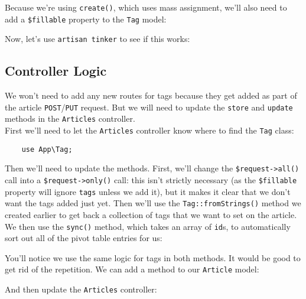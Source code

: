
Because we're using \texttt{create()}, which uses mass assignment, we'll also need to add a \texttt{\$fillable} property to the \texttt{Tag} model:


Now, let's use \texttt{artisan tinker} to see if this works:




\subsection{Controller Logic}

We won't need to add any new routes for tags because they get added as part of the article \texttt{POST}/\texttt{PUT} request. But we will need to update the \texttt{store} and \texttt{update} methods in the \texttt{Articles} controller.
\\

First we'll need to let the \texttt{Articles} controller know where to find the \texttt{Tag} class:

\begin{verbatim}
    use App\Tag;
\end{verbatim}

Then we'll need to update the methods. First, we'll change the \texttt{\$request->all()} call into a \texttt{\$request->only()} call: this isn't strictly necessary (as the \texttt{\$fillable} property will ignore \texttt{tags} unless we add it), but it makes it clear that we don't want the tags added just yet. Then we'll use the \texttt{Tag::fromStrings()} method we created earlier to get back a collection of tags that we want to set on the article. We then use the \texttt{sync()} method, which takes an array of \texttt{id}s, to automatically sort out all of the pivot table entries for us:


You'll notice we use the same logic for tags in both methods. It would be good to get rid of the repetition. We can add a method to our \texttt{Article} model:


And then update the \texttt{Articles} controller:



